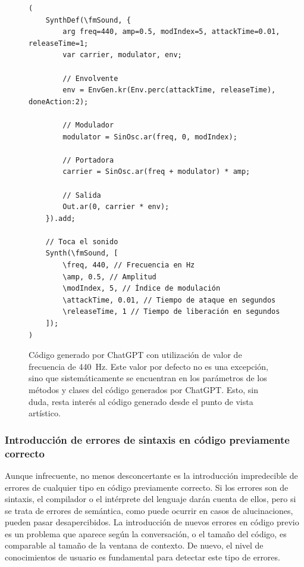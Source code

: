 \begin{figure}[H]
    \caption[Código generado por ChatGPT con utilización de valor de frecuencia de \SI{440}{\hertz}]{Código generado por ChatGPT con utilización de valor de frecuencia de \SI{440}{\hertz}. Este valor por defecto no es una excepción, sino que sistemáticamente se encuentran en los parámetros de los métodos y clases del código generados por ChatGPT. Esto, sin duda, resta interés al código generado desde el punto de vista artístico.}
    \centering
    \begin{lstlisting}[style=SuperCollider-IDE, basicstyle=\footnotesize\ttfamily, numbers=none]
(
    SynthDef(\fmSound, {
        arg freq=440, amp=0.5, modIndex=5, attackTime=0.01, releaseTime=1;
        var carrier, modulator, env;
    
        // Envolvente
        env = EnvGen.kr(Env.perc(attackTime, releaseTime), doneAction:2);
    
        // Modulador
        modulator = SinOsc.ar(freq, 0, modIndex);
    
        // Portadora
        carrier = SinOsc.ar(freq + modulator) * amp;
    
        // Salida
        Out.ar(0, carrier * env);
    }).add;
    
    // Toca el sonido
    Synth(\fmSound, [
        \freq, 440, // Frecuencia en Hz
        \amp, 0.5, // Amplitud
        \modIndex, 5, // Índice de modulación
        \attackTime, 0.01, // Tiempo de ataque en segundos
        \releaseTime, 1 // Tiempo de liberación en segundos
    ]);
) 
    \end{lstlisting}
    \source{\propio}
    \label{fig:ChatGPT_valores_por_defecto}
\end{figure}



\subsubsection{Introducción de errores de sintaxis en código previamente correcto}
Aunque infrecuente, no menos desconcertante es la introducción impredecible de errores de cualquier tipo en código previamente correcto. Si los errores son de sintaxis, el compilador o el intérprete del lenguaje darán cuenta de ellos, pero si se trata de errores de semántica, como puede ocurrir en casos de alucinaciones, pueden pasar desapercibidos. La introducción de nuevos errores en código previo es un problema que aparece según la conversación, o el tamaño del código, es comparable al tamaño de la ventana de contexto. De nuevo, el nivel de conocimientos de usuario es fundamental para detectar este tipo de errores.



